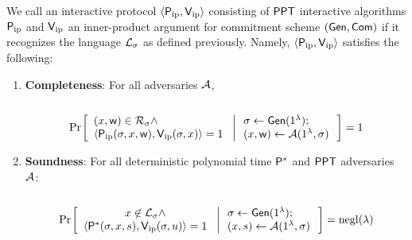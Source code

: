 \begin{definition}\label{defn:innerproductarg} 
We call an interactive protocol $\langle \mathsf{P}_\mathrm{ip},\mathsf{V}_\mathrm{ip}\rangle$ consisting of $\mathsf{PPT}$ interactive algorithms $\mathsf{P}_\mathrm{ip}$ and $\mathsf{V}_\mathrm{ip}$ an inner-product argument for commitment scheme $(\mathsf{Gen},\mathsf{Com})$ if it recognizes the language $\mathcal{L}_\sigma$ as defined previously. Namely, $\langle \mathsf{P}_\mathrm{ip},\mathsf{V}_\mathrm{ip}\rangle$ satisfies the following:
\begin{enumerate}[{\rm (i)}]
\item {\bf Completeness}: For all adversaries $\mathcal{A}$,
\footnotesize \\~
\begin{align*}
\condprob{
	\begin{array}{l}
	(\stmt,\wit)\in \calR_\sigma \wedge \\ \langle \pip(\sigma,\stmt,\wit),\vip(\sigma,\stmt)\rangle=1
	\end{array}}{
	\begin{array}{l}
	\sigma\gets \gen(\secparam);\\
	(\stmt,\wit)\gets \adv(\secparam,\sigma)
	\end{array}
}
=1
\end{align*}
\normalsize

\item{\bf Soundness}: For all deterministic polynomial time $\mathsf{P}^*$ and $\mathsf{PPT}$ adversaries $\mathcal{A}$:
\footnotesize \\~
\begin{align*}
\condprob{
	\begin{array}{c}
	\stmt\not\in \calL_\sigma \wedge \\
	\langle
\prover^*(\sigma,\stmt,s),\vip(\sigma,u)\rangle=1
\end{array}}{
\begin{array}{l}
\sigma\gets \gen(\secparam);\\
(\stmt,s)\gets \adv(\secparam,\sigma)
\end{array}
} = \negl(\lambda)
\end{align*}

\end{enumerate}

\end{definition}

